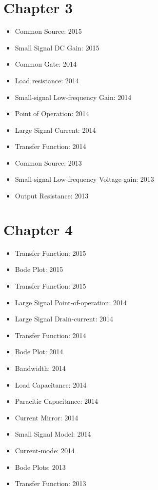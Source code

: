 \documentclass[twocolumn]{article}
\begin{document}
  \section*{Chapter 3}
    \begin{itemize}
      \item Common Source: 2015
      \item Small Signal DC Gain: 2015

      \item Common Gate: 2014
      \item Load resistance: 2014
      \item Small-signal Low-frequency Gain: 2014
      \item Point of Operation: 2014
      \item Large Signal Current: 2014
      \item Transfer Function: 2014

      \item Common Source: 2013
      \item Small-signal Low-frequency Voltage-gain: 2013
      \item Output Resistance: 2013
    \end{itemize}
  \section*{Chapter 4}
    \begin{itemize}
      \item Transfer Function: 2015
      \item Bode Plot: 2015
      \item Transfer Function: 2015

      \item Large Signal Point-of-operation: 2014
      \item Large Signal Drain-current: 2014
      \item Transfer Function: 2014
      \item Bode Plot: 2014
      \item Bandwidth: 2014
      \item Load Capacitance: 2014
      \item Paracitic Capacitance: 2014
      \item Current Mirror: 2014
      \item Small Signal Model: 2014
      \item Current-mode: 2014

      \item Bode Plots: 2013
      \item Transfer Function: 2013
    \end{itemize}
\end{document}
